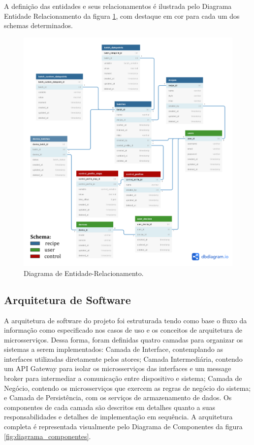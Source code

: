 A definição das entidades e seus relacionamentos é ilustrada pelo Diagrama Entidade Relacionamento da figura \ref{fig:diagrama_entidade_relacionamento}, com destaque em cor para cada um 
dos schemas determinados.

\begin{figure}[ht]
    \centering
    \includegraphics[scale=0.15]{figuras/projeto/software/banco_de_dados.png}
    \caption{Diagrama de Entidade-Relacionamento.}
    \label{fig:diagrama_entidade_relacionamento}
\end{figure}

\subsection{Arquitetura de Software}

A arquitetura de software do projeto foi estruturada tendo como base o fluxo da informação como especificado nos casos de uso e os conceitos de arquitetura de microsserviços. Dessa forma, foram definidas quatro camadas para organizar os sistemas a serem implementados: Camada de Interface, contemplando as interfaces utilizadas diretamente pelos atores; Camada Intermediária, contendo um API Gateway para isolar os microsserviços das interfaces e um message broker para intermediar a comunicação entre dispositivo e sistema; Camada de Negócio, contendo os microsserviços que exercem as regras de negócio do sistema; e Camada de Persistência, com os serviços de armazenamento de dados. Os componentes de cada camada são descritos em detalhes quanto a suas responsabilidades e detalhes de implementação em sequência. A arquitetura completa é representada visualmente pelo Diagrama de Componentes da figura \ref{fig:diagrama_componentes}.

